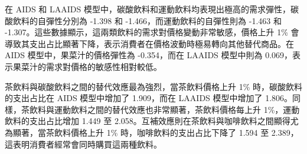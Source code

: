在 AIDS 和 LAAIDS 模型中，碳酸飲料和運動飲料均表現出極高的需求彈性，碳酸飲料的自彈性分別為 -1.398 和 -1.466，而運動飲料的自彈性則為 -1.463 和 -1.307。這些數據顯示，這兩類飲料的需求對價格變動非常敏感，價格上升 1\% 會導致其支出占比顯著下降，表示消費者在價格波動時極易轉向其他替代商品。在 AIDS 模型中，果菜汁的價格彈性為 -0.354，而在 LAAIDS 模型中則為 0.069，表示果菜汁的需求對價格的敏感性相對較低。

茶飲料與碳酸飲料之間的替代效應最為強烈，當茶飲料價格上升 1\% 時，碳酸飲料的支出占比在 AIDS 模型中增加了 1.909，而在 LAAIDS 模型中增加了 1.806。同樣，茶飲料與運動飲料之間的替代效應也非常顯著，茶飲料價格每上升 1\%，運動飲料的支出占比增加 1.449 至 2.058。互補效應則在茶飲料與咖啡飲料之間顯得尤為顯著，當茶飲料價格上升 1\% 時，咖啡飲料的支出占比下降了 1.594 至 2.389，這表明消費者經常會同時購買這兩種飲料。

